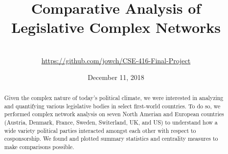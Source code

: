 \documentclass[12pt]{article}
\title{Comparative Analysis of Legislative Complex Networks}
\author{\names \\ \small\url{https://github.com/jowch/CSE-416-Final-Project}}
\date{December 11, 2018}
\begin{document}
\maketitle
\thispagestyle{empty}

\begin{abstract}
    Given the complex nature of today's political climate, we were interested in analyzing and quantifying various legislative bodies in select first-world countries. To do so, we performed complex network analysis on seven North Amerian and European countries (Austria, Denmark, France, Sweden, Switerland, UK, and US) to understand how a wide variety political parties interacted amongst each other with respect to cosponsorship. We found and plotted summary statistics and centrality measures to make comparisons possible.
\end{abstract}
\end{document}
